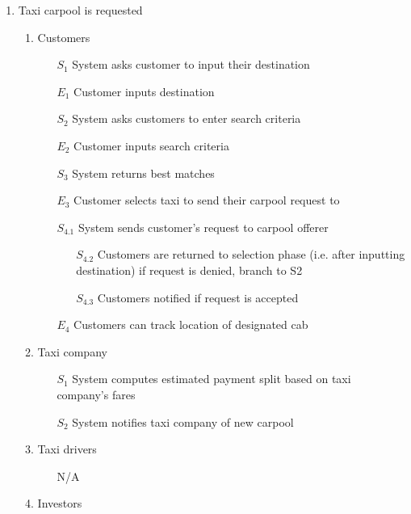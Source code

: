 \documentclass[]{article}
\begin{document}
\begin{enumerate}[{\textbf{BE}}1.]
\begin{enumerate}[{VP2}.1]
\begin{enumerate}
            \end{enumerate}
    \end{enumerate}
    \item Taxi carpool is requested
    \begin{enumerate}[{VP3}.1]
        \item Customers
            \begin{enumerate}
                \item[$S_1$] System asks customer to input their destination
                \item[$E_1$] Customer inputs destination
	     \item[$S_2$] System asks customers to enter search criteria
	     \item[$E_2$] Customer inputs search criteria
 	     \item[$S_3$] System returns best matches
                \item[$E_3$] Customer selects taxi to send their carpool request to
\item[$S_{4.1}$] System sends customer's request to carpool offerer
                \begin{enumerate}
                    \item[$S_{4.2}$] Customers are returned to selection phase (i.e. after inputting destination) if request is denied, branch to S2
                    \item[$S_{4.3}$] Customers notified if request is accepted
                \end{enumerate}
                \item[$E_4$] Customers can track location of designated cab
            \end{enumerate}
        \item Taxi company
            \begin{enumerate}
                \item[$S_1$] System computes estimated payment split based on taxi company's fares
	        \item[$S_2$] System notifies taxi company of new carpool
            \end{enumerate}
        \item Taxi drivers
            \begin{enumerate}
                \item[N/A]
            \end{enumerate}
        \item Investors
            \begin{enumerate}

\end{enumerate}
\end{enumerate}
\end{enumerate}
\end{document}
